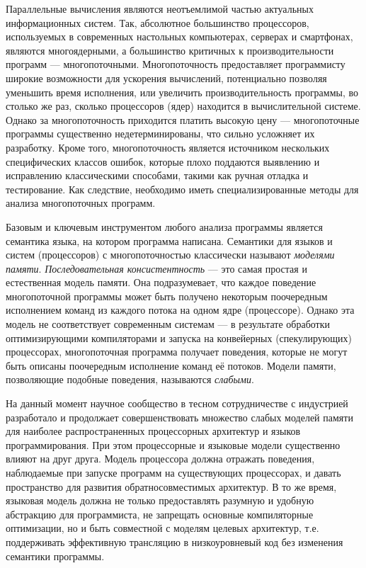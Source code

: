 
{\actuality} Параллельные вычисления являются неотъемлимой частью актуальных
информационных систем. Так, абсолютное большинство процессоров, используемых
в современных настольных компьютерах, серверах и смартфонах, являются многоядерными,
а большинство критичных к производительности программ --- многопоточными.
Многопоточность предоставляет программисту широкие возможности для ускорения вычислений,
потенциально позволяя уменьшить время исполнения, или увеличить производительность программы,
во столько же раз, сколько
процессоров (ядер) находится в вычислительной системе. Однако за многопоточность приходится
платить высокую цену --- многопоточные программы существенно недетерминированы, что сильно
усложняет их разработку. Кроме того, многопоточность является источником нескольких
специфических классов ошибок, которые плохо поддаются выявлению и исправлению классическими
способами, такими как ручная отладка и тестирование. Как следствие, необходимо иметь
специализированные методы для анализа многопоточных программ.

Базовым и ключевым инструментом любого анализа программы является семантика языка,
на котором программа написана. Семантики для языков и систем (процессоров) с
многопоточностью классически называют \emph{моделями памяти}.
\emph{Последовательная консистентность} --- это самая простая и естественная модель
памяти. Она подразумевает, что каждое поведение многопоточной программы может быть
получено некоторым поочередным исполнением команд из каждого потока на одном ядре
(процессоре). Однако эта модель не соответствует современным системам ---
в результате обработки оптимизирующими компиляторами и запуска на конвейерных
(спекулирующих) процессорах, многопоточная программа получает поведения, которые не могут
быть описаны поочередным исполнение команд её потоков. Модели памяти, позволяющие
подобные поведения, называются \emph{слабыми}.

На данный момент научное сообщество в тесном сотрудничестве с индустрией
разработало и продолжает совершенствовать множество слабых моделей памяти для
наиболее распространенных процессорных архитектур и языков программирования.
При этом процессорные и языковые модели существенно влияют на друг друга.
Модель процессора должна отражать поведения, наблюдаемые при запуске программ
на существующих процессорах, и давать пространство для развития
обратносовместимых архитектур. В то же время, языковая модель должна не только
предоставлять разумную и удобную абстракцию для программиста, не запрещать основные
компиляторные оптимизации, но и быть совместной с моделям целевых архитектур,
т.е. поддерживать эффективную трансляцию в низкоуровневый код без изменения
семантики программы.


